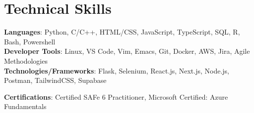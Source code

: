 \documentclass[letterpaper,11pt]{article}
\newcommand{\resumeSubHeadingListStart}{\begin{itemize}[leftmargin=0.0in, label={}]}
\newcommand{\resumeSubHeadingListEnd}{\end{itemize}}
\begin{document}
\begin{comment}
\section{Relevant Coursework}
        \begin{multicols}{4}
            \begin{itemize}[itemsep=-5pt, parsep=3pt]
                \item\small Data Structures
                \item Software Methodology
                \item Algorithms Analysis
                \item Database Management
                \item Artificial Intelligence
                \item Internet Technology
                \item Systems Programming
                \item Computer Architecture
            \end{itemize}
        \end{multicols}
        \vspace*{2.0\multicolsep}
\end{comment}

\section{Technical Skills}
 \begin{itemize}[leftmargin=0.15in, label={}]
    \small{\item{
     \textbf{Languages}{: Python, C/C++, HTML/CSS, JavaScript, TypeScript, SQL, R, Bash, Powershell} \\
     \textbf{Developer Tools}{: Linux, VS Code, Vim, Emacs, Git, Docker, AWS, Jira, Agile Methodologies} \\
     \textbf{Technologies/Frameworks}{: Flask, Selenium, React.js, Next.js, Node.js, Postman, TailwindCSS, Supabase} \\
     \begin{comment} 
    \textbf{Offensive/Defensive Security Tools}{: Metasploit, Burp Suite, Nmap, Wireshark, Ghidra, GDB+GEF, Radare2} \\
    \end{comment}  
    \textbf{Certifications}{: Certified SAFe 6 Practitioner, Microsoft Certified: Azure Fundamentals} \\
    }}
 \end{itemize}
 \vspace{-16pt}
\end{document}
